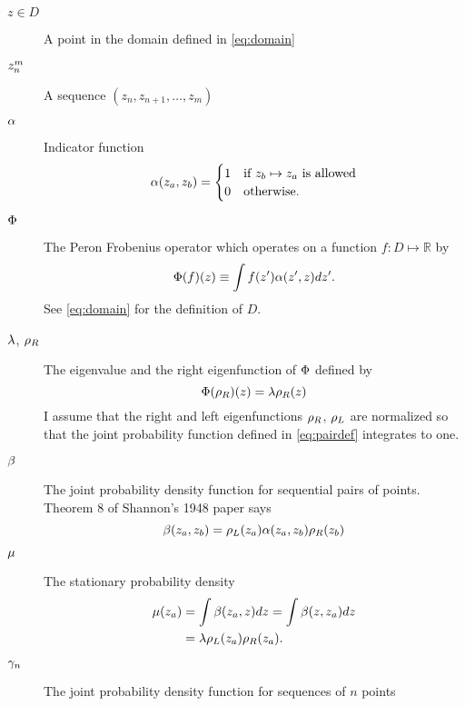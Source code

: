 \documentclass[twocolumn]{article}
\newcommand{\field}[1]{\mathbb{#1}}
\newcommand\REAL{\field{R}}
\begin{document}
\begin{description}
\item[$z\in D$] A point in the domain defined in \eqref{eq:domain}
\item[$z_{n}^{m}$] A sequence $(z_n, z_{n+1}, \ldots, z_m)$
\item[$\alpha$] Indicator function
  \begin{equation*}
    \alpha(z_a,z_b) =
    \begin{cases}
      1 & \text{if }z_b \mapsto z_a \text{ is allowed}\\
      0 & \text{otherwise}.
    \end{cases}
  \end{equation*}
\item[$\Phi$] The Peron Frobenius operator which operates on a
  function $f:D\mapsto \REAL$ by 
  \begin{equation*}
    \Phi(f)(z) \equiv \int f(z') \alpha(z',z) dz'.
  \end{equation*}
  See \eqref{eq:domain} for the definition of $D$. 
\item[$\lambda$, $\rho_R$] The eigenvalue and the right eigenfunction
  of $\Phi$ defined by
  \begin{equation*}
    \Phi(\rho_R)(z) = \lambda \rho_R(z)
  \end{equation*}
  I assume that the right and left eigenfunctions $\rho_R$, $\rho_L$
  are normalized so that the joint probability function defined in
  \eqref{eq:pairdef} integrates to one.
\item[$\beta$] The joint probability density function for sequential
  pairs of points.  Theorem 8 of Shannon's 1948 paper says
  \begin{equation}
    \label{eq:pairdef}
    \beta(z_a,z_b) = \rho_L(z_a) \alpha(z_a,z_b) \rho_R(z_b)
  \end{equation}
\item[$\mu$] The stationary probability density
  \begin{align}
    \mu(z_a) &= \int \beta(z_a,z) dz = \int \beta(z,z_a) dz
                       \nonumber \\
    \label{eq:stationary}
                     &= \lambda \rho_L(z_a) \rho_R(z_a).
  \end{align}
\item[$\gamma_{n}$] The joint probability density function for
  sequences of $n$ points
  \begin{equation}

\end{equation}
\end{description}
\end{document}
